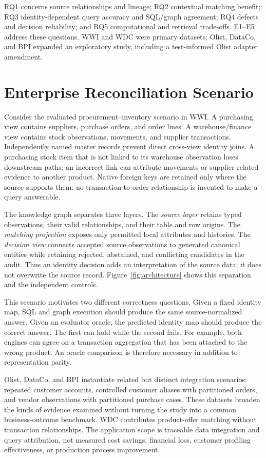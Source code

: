 \documentclass[conference,letterpaper]{IEEEtran}
\begin{document}
RQ1 concerns source relationships and lineage; RQ2 contextual matching benefit; RQ3 identity-dependent query accuracy and SQL/graph agreement; RQ4 defects and decision reliability; and RQ5 computational and retrieval trade-offs. E1--E5 address these questions. WWI and WDC were primary datasets; Olist, DataCo, and BPI expanded an exploratory study, including a test-informed Olist adapter amendment.

\section{Enterprise Reconciliation Scenario}
\label{sec:scenario}
Consider the evaluated procurement--inventory scenario in WWI. A purchasing view contains suppliers, purchase orders, and order lines. A warehouse/finance view contains stock observations, movements, and supplier transactions. Independently named master records prevent direct cross-view identity joins. A purchasing stock item that is not linked to its warehouse observation loses downstream paths; an incorrect link can attribute movements or supplier-related evidence to another product. Native foreign keys are retained only where the source supports them: no transaction-to-order relationship is invented to make a query answerable.

The knowledge graph separates three layers. The \emph{source layer} retains typed observations, their valid relationships, and their table and row origins. The \emph{matching projection} exposes only permitted local attributes and histories. The \emph{decision view} connects accepted source observations to generated canonical entities while retaining rejected, abstained, and conflicting candidates in the audit. Thus an identity decision adds an interpretation of the source data; it does not overwrite the source record. Figure~\ref{fig:architecture} shows this separation and the independent controls.

This scenario motivates two different correctness questions. Given a fixed identity map, SQL and graph execution should produce the same source-normalized answer. Given an evaluator oracle, the predicted identity map should produce the correct answer. The first can hold while the second fails. For example, both engines can agree on a transaction aggregation that has been attached to the wrong product. An oracle comparison is therefore necessary in addition to representation parity.

Olist, DataCo, and BPI instantiate related but distinct integration scenarios: repeated customer accounts, controlled customer aliases with partitioned orders, and vendor observations with partitioned purchase cases. These datasets broaden the kinds of evidence examined without turning the study into a common business-outcome benchmark. WDC contributes product-offer matching without transaction relationships. The application scope is traceable data integration and query attribution, not measured cost savings, financial loss, customer profiling effectiveness, or production process improvement.
\end{document}
